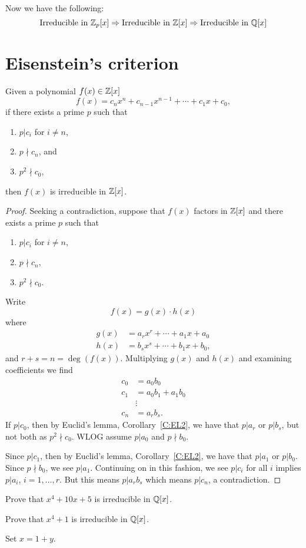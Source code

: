 \documentclass{ximera}
\begin{document}
Now we have the following:
\[
\text{Irreducible in $\mathbb Z_p[x]$} \Rightarrow \text{Irreducible in $\mathbb Z[x]$}  \Rightarrow \text{Irreducible in $\mathbb Q[x]$}
\]


\section{Eisenstein's criterion}



\begin{theorem}
  Given a polynomial $f(x) \in\mathbb Z[x]$
  \[
  f(x) = c_nx^n + c_{n-1}x^{n-1} + \cdots + c_1 x + c_0,
  \]
  if there exists a prime $p$ such that
  \begin{enumerate}
  \item $p|c_i$ for $i \ne n$,
  \item $p\nmid c_n$, and
  \item $p^2\nmid c_0$,
  \end{enumerate}
  then $f(x)$ is irreducible in $\mathbb Z[x]$.
  \begin{proof}
    Seeking a contradiction, suppose that $f(x)$ factors in $\mathbb Z[x]$ and there exists a prime $p$ such that
  \begin{enumerate}
  \item $p|c_i$ for $i \ne n$,
  \item $p\nmid c_n$,
  \item $p^2\nmid c_0$.
  \end{enumerate}
  Write
  \[
  f(x) = g(x) \cdot h(x)
  \]
  where
  \begin{align*}
    g(x) &= a_rx^r + \cdots + a_1 x+ a_0\\
    h(x) &= b_sx^s + \cdots + b_1 x+ b_0,
  \end{align*}
  and $r + s = n = \deg(f(x))$. Multiplying $g(x)$ and $h(x)$ and
  examining coefficients we find
  \begin{align*}
    c_0 &= a_0b_0\\
    c_1 &= a_0b_1 + a_1 b_0\\
    &\vdots \\
    c_n &= a_r b_s.
  \end{align*}
  If $p| c_0$, then by Euclid's lemma, Corollary~\ref{C:EL2}, we have
    that $p|a_r$ or $p|b_s$, but not both as $p^2\nmid c_0$. WLOG
    assume $p|a_0$ and $p\nmid b_0$.

    Since $p|c_1$, then by Euclid's lemma, Corollary~\ref{C:EL2}, we
    have that $p|a_1$ or $p|b_0$. Since $p\nmid b_0$, we see
    $p|a_1$. Continuing on in this fashion, we see $p|c_i$ for all $i$
    implies $p| a_i$, $i=1,\dots, r$. But this means $p|a_rb_s$ which
    means $p|c_n$, a contradiction.
  \end{proof}
\end{theorem}

\begin{exercise}
  Prove that $x^4 + 10x + 5$ is irreducible in $\mathbb Q[x]$.
\end{exercise}



\begin{exercise}
  Prove that $x^4 + 1$ is irreducible in $\mathbb Q[x]$.
  \begin{hint}
    Set $x = 1+y$.
  \end{hint}
\end{exercise}
\end{document}
